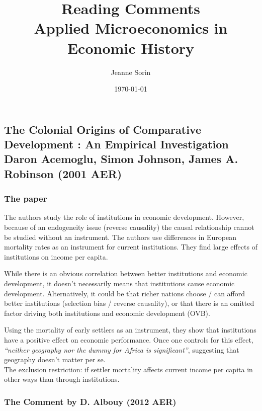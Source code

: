 \documentclass[12pt, final]{article}
\title{Reading Comments \\ Applied Microeconomics in Economic History}
\author{Jeanne Sorin}
\date{\today}
\begin{document}
\maketitle

\newpage

\subsection*{The Colonial Origins of Comparative Development : An Empirical Investigation \\ Daron Acemoglu, Simon Johnson, James A. Robinson (2001 AER)} %


\subsubsection*{The paper} %
\label{ssub:the_paper}

The authors study the role of institutions in economic development. However, because of an endogeneity issue (reverse causality) the causal relationship cannot be studied without an instrument. The authors use differences in European mortality rates as an instrument for current institutions. They find large effects of institutions on income per capita.

While there is an obvious correlation between better institutions and economic development, it doesn't necessarily means that institutions cause economic development. Alternatively, it could be that richer nations choose / can afford better institutions (selection bias / reverse causality), or that there is an omitted factor driving both institutions and economic development (OVB).

Using the mortality of early settlers as an instrument, they show that institutions have a positive effect on economic performance. Once one controls for this effect, \textit{``neither geography nor  the dummy for Africa is significant''}, suggesting that geography doesn't matter per se.
\\
The exclusion restriction: if settler mortality affects current income per capita in other ways than through institutions.



\subsubsection*{The Comment by D. Albouy (2012 AER)} %
\end{document}
